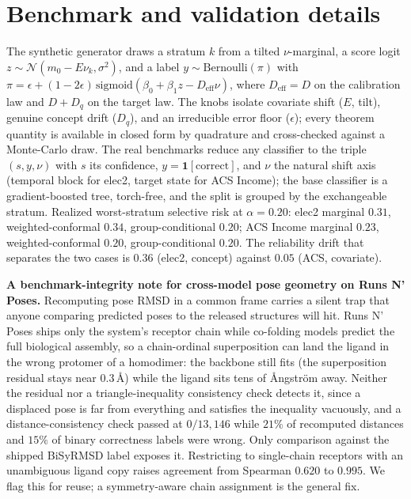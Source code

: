 \documentclass[10pt]{article}
\begin{document}
\section{Benchmark and validation details}\label{app:bench}
\small
The synthetic generator draws a stratum $k$ from a tilted $\nu$-marginal, a score logit
$z\sim\mathcal{N}(m_0-E\nu_k,\sigma^2)$, and a label $y\sim\mathrm{Bernoulli}(\pi)$ with
$\pi=\epsilon+(1-2\epsilon)\,\mathrm{sigmoid}(\beta_0+\beta_1 z-D_{\mathrm{eff}}\nu)$, where
$D_{\mathrm{eff}}=D$ on the calibration law and $D+D_q$ on the target law. The knobs isolate
covariate shift ($E$, tilt), genuine concept drift ($D_q$), and an irreducible error floor
($\epsilon$); every theorem quantity is available in closed form by quadrature and cross-checked
against a Monte-Carlo draw. The real benchmarks reduce any classifier to the triple
$(s,y,\nu)$ with $s$ its confidence, $y=\mathbf{1}[\text{correct}]$, and $\nu$ the natural shift
axis (temporal block for elec2, target state for ACS Income); the base classifier is a
gradient-boosted tree, torch-free, and the split is grouped by the exchangeable stratum. Realized
worst-stratum selective risk at $\alpha=0.20$: elec2 marginal $0.31$, weighted-conformal $0.34$,
group-conditional $0.20$; ACS Income marginal $0.23$, weighted-conformal $0.20$, group-conditional
$0.20$. The reliability drift that separates the two cases is $0.36$ (elec2, concept) against
$0.05$ (ACS, covariate).

\textbf{A benchmark-integrity note for cross-model pose geometry on Runs N' Poses.} Recomputing pose
RMSD in a common frame carries a silent trap that anyone comparing predicted poses to the released
structures will hit. Runs N' Poses ships only the system's receptor chain while co-folding models
predict the full biological assembly, so a chain-ordinal superposition can land the ligand in the
wrong protomer of a homodimer: the backbone still fits (the superposition residual stays near
$0.3$\,\AA) while the ligand sits tens of \AA ngstr\"om away. Neither the residual nor a
triangle-inequality consistency check detects it, since a displaced pose is far from everything and
satisfies the inequality vacuously, and a distance-consistency check passed at $0/13{,}146$ while
$21\%$ of recomputed distances and $15\%$ of binary correctness labels were wrong. Only comparison
against the shipped BiSyRMSD label exposes it. Restricting to single-chain receptors with an
unambiguous ligand copy raises agreement from Spearman $0.620$ to $0.995$. We flag this for reuse;
a symmetry-aware chain assignment is the general fix.
\end{document}
